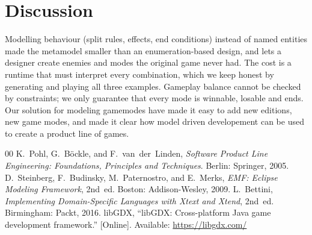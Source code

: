 \documentclass[conference]{IEEEtran}
\begin{document}
\section{Discussion}
Modelling behaviour (split rules, effects, end conditions) instead of named entities made the
metamodel smaller than an enumeration-based design, and lets a designer create enemies and modes the
original game never had. The cost is a runtime that must interpret every combination, which we keep
honest by generating and playing all three examples. Gameplay balance cannot be checked by
constraints; we only guarantee that every mode is winnable, losable and ends. Our solution for modeling gamemodes have
 made it easy to add new editions, new game modes, and made it clear how model driven developement can be used to create a product line of games.

\begin{thebibliography}{00}
 K.~Pohl, G.~B\"ockle, and F.~van~der~Linden, \emph{Software Product Line Engineering:
Foundations, Principles and Techniques}. Berlin: Springer, 2005.
 D.~Steinberg, F.~Budinsky, M.~Paternostro, and E.~Merks, \emph{EMF: Eclipse Modeling
Framework}, 2nd~ed. Boston: Addison-Wesley, 2009.
 L.~Bettini, \emph{Implementing Domain-Specific Languages with Xtext and Xtend},
2nd~ed. Birmingham: Packt, 2016.
 libGDX, ``libGDX: Cross-platform Java game development framework.'' [Online].
Available: \url{https://libgdx.com/}
\end{thebibliography}
\end{document}
